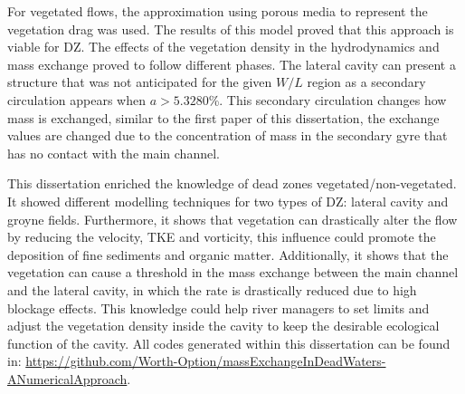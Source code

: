 For vegetated flows, the approximation using porous media to represent the vegetation drag was used. The results of this model proved that this approach is viable for DZ. The effects of the vegetation density in the hydrodynamics and mass exchange proved to follow different phases. The lateral cavity can present a structure that was not anticipated for the given $W/L$ region as a secondary circulation appears when $a>5.3280$\%. This secondary circulation changes how mass is exchanged, similar to the first paper of this dissertation, the exchange values are changed due to the concentration of mass in the secondary gyre that has no contact with the main channel.

This dissertation enriched the knowledge of dead zones vegetated/non-vegetated. It showed different modelling techniques for two types of DZ: lateral cavity and groyne fields. Furthermore, it shows that vegetation can drastically alter the flow by reducing the velocity, TKE and vorticity, this influence could promote the deposition of fine sediments and organic matter. Additionally, it shows that the vegetation can cause a threshold in the mass exchange between the main channel and the lateral cavity, in which the rate is drastically reduced due to high blockage effects. This knowledge could help river managers to set limits and adjust the vegetation density inside the cavity to keep the desirable ecological function of the cavity. All codes generated within this dissertation can be found in: \href{https://github.com/Worth-Option/massExchangeInDeadWaters-ANumericalApproach}{https://github.com/Worth-Option/massExchangeInDeadWaters-ANumericalApproach}.